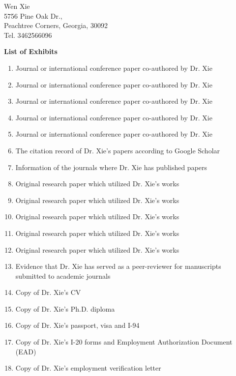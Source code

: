\documentclass{article}
\begin{document}
\vspace{2\baselineskip}

Wen Xie\\
5756 Pine Oak Dr.,\\
Peachtree Corners, Georgia, 30092\\
Tel. 3462566096
\clearpage

{\bf List of Exhibits}
\label{exhib}

\begin{enumerate}[label={Exhibit \arabic*:}]
    \item Journal or international conference paper co-authored by Dr. Xie 
    \item Journal or international conference paper co-authored by Dr. Xie 
    \item Journal or international conference paper co-authored by Dr. Xie 
    \item Journal or international conference paper co-authored by Dr. Xie 
    \item Journal or international conference paper co-authored by Dr. Xie 
    \item The citation record of Dr. Xie’s papers according to Google Scholar 
    \item Information of the journals where Dr. Xie has published papers 
    \item Original research paper which utilized Dr. Xie’s works 
    \item Original research paper which utilized Dr. Xie’s works 
    \item Original research paper which utilized Dr. Xie’s works  
    \item Original research paper which utilized Dr. Xie’s works 
    \item Original research paper which utilized Dr. Xie’s works 
    \item Evidence that Dr. Xie has served as a peer-reviewer for manuscripts submitted to academic journals
    \item Copy of Dr. Xie’s CV
    \item Copy of Dr. Xie’s Ph.D. diploma
    \item Copy of Dr. Xie’s passport, visa and I-94
    \item Copy of Dr. Xie’s I-20 forms and Employment Authorization Document (EAD) 
    \item Copy of Dr. Xie’s employment verification letter
\end{enumerate}

\clearpage
\end{document}
